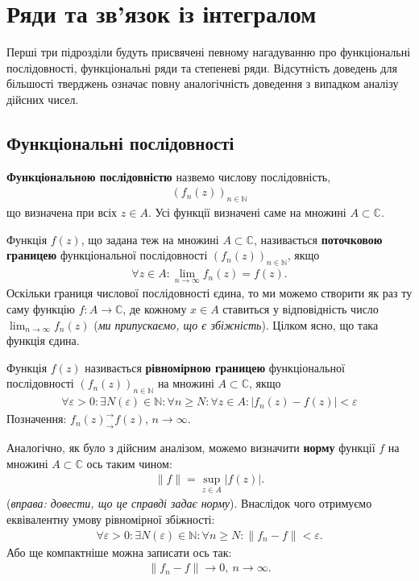 \documentclass{math_library}
\begin{document}
\section{Ряди та зв'язок із інтегралом}
Перші три підрозділи будуть присвячені певному нагадуванню про функціональні послідовності, функціональні ряди та степеневі ряди. Відсутність доведень для більшості тверджень означає повну аналогічність доведення з випадком аналізу дійсних чисел.

\subsection{Функціональні послідовності}
\begin{definition}
\textbf{Функціональною послідовністю} назвемо числову послідовність,
\begin{align*}
(f_n(z))_{n \in \mathbb{N}}
\end{align*}
що визначена при всіх $z \in A$. Усі функції визначені саме на множині $A \subset \mathbb{C}$.
\end{definition}

\begin{definition}
Функція $f(z)$, що задана теж на множині $A \subset \mathbb{C}$, називається \textbf{поточковою границею} функціональної послідовності $(f_n(z))_{n \in \mathbb{N}}$, якщо
\begin{align*}
\forall z \in A: \lim_{n \to \infty} f_n(z) = f(z).
\end{align*}
Оскільки границя числової послідовності єдина, то ми можемо створити як раз ту саму функцію $f \colon A \to \mathbb{C}$, де кожному $x \in A$ ставиться у відповідність число $\displaystyle\lim_{n \to \infty} f_n(z)$ (\textit{ми припускаємо, що є збіжність}). Цілком ясно, що така функція єдина.
\end{definition}


\begin{definition}
Функція $f(z)$ називається \textbf{рівномірною границею} функціональної послідовності $(f_n(z))_{n \in \mathbb{N}}$ на множині $A \subset \mathbb{C}$, якщо
\begin{align*}
\forall \varepsilon > 0: \exists N(\varepsilon) \in \mathbb{N}: \forall n \geq N: \forall z \in A: |f_n(z)-f(z)| < \varepsilon
\end{align*}
Позначення: $f_n(z)^\rightarrow_\rightarrow f(z)$, $n \to \infty$.
\end{definition}

Аналогічно, як було з дійсним аналізом, можемо визначити \textbf{норму} функції $f$ на множині $A \subset \mathbb{C}$ ось таким чином:
\begin{align*}
\|f\| = \sup_{z \in A} |f(z)|.
\end{align*}
(\textit{вправа: довести, що це справді задає норму}). Внаслідок чого отримуємо еквівалентну умову рівномірної збіжності:
\begin{align*}
\forall \varepsilon > 0: \exists N(\varepsilon) \in \mathbb{N}: \forall n \geq N: \| f_n - f\| < \varepsilon.
\end{align*}
Або ще компактніше можна записати ось так:
\begin{align*}
\| f_n - f \| \to 0,\ n \to \infty.
\end{align*}
\end{document}
